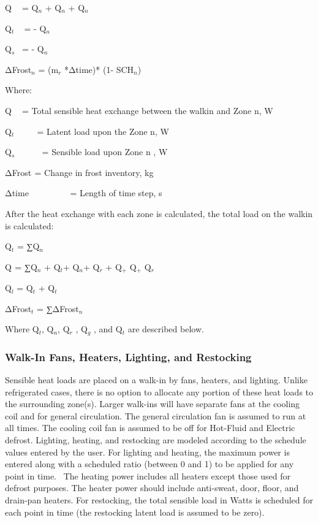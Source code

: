 Q\(_{ }\) ~ = Q\(_{n}\) + Q\(_{n}\) + Q\(_{n}\)

Q\(_{t}\) ~ = - Q\(_{n}\)

Q\(_{s}\)~ = - Q\(_{n}\)

ΔFrost\(_{n}\) = (m\(_{r}\) *Δtime)* (1- SCH\(_{n}\))

Where:

Q\(_{ }\) ~ = Total sensible heat exchange between the walkin and Zone n, W

Q\(_{t}\) ~~~~ = Latent load upon the Zone n, W

Q\(_{s}\) ~~~~~ = Sensible load upon Zone n , W

ΔFrost\(_{ }\) = Change in frost inventory, kg

Δtime~~~~~~~~~ = Length of time step, s

After the heat exchange with each zone is calculated, the total load on the walkin is calculated:

Q\(_{t}\) = ∑Q\(_{n}\)

Q\(_{ }\) = ∑Q\(_{n}\) + Q\(_{t}\)+ Q\(_{n}\)+ Q\(_{r}\) + Q\(_{+}\) Q\(_{+}\) Q\(_{r}\)

Q\(_{l}\) = Q\(_{t}\) + Q\(_{t}\)

ΔFrost\(_{t}\) = ∑ΔFrost\(_{n}\)

Where Q\(_{t}\), Q\(_{n}\), Q\(_{r}\) , Q\(_{g}\) , and Q\(_{t}\) are described below.

\subsubsection{Walk-In Fans, Heaters, Lighting, and Restocking}\label{walk-in-fans-heaters-lighting-and-restocking}

Sensible heat loads are placed on a walk-in by fans, heaters, and lighting. Unlike refrigerated cases, there is no option to allocate any portion of these heat loads to the surrounding zone(s). Larger walk-ins will have separate fans at the cooling coil and for general circulation. The general circulation fan is assumed to run at all times. The cooling coil fan is assumed to be off for Hot-Fluid and Electric defrost. Lighting, heating, and restocking are modeled according to the schedule values entered by the user. For lighting and heating, the maximum power is entered along with a scheduled ratio (between 0 and 1) to be applied for any point in time.~ The heating power includes all heaters except those used for defrost purposes. The heater power should include anti-sweat, door, floor, and drain-pan heaters. For restocking, the total sensible load in Watts is scheduled for each point in time (the restocking latent load is assumed to be zero).

